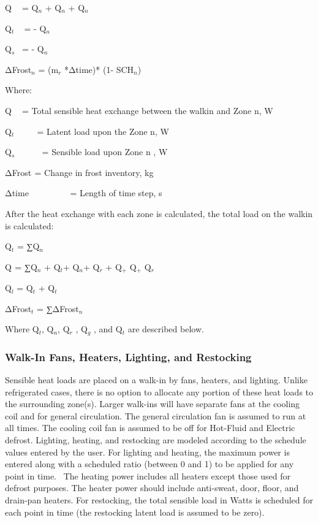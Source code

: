 Q\(_{ }\) ~ = Q\(_{n}\) + Q\(_{n}\) + Q\(_{n}\)

Q\(_{t}\) ~ = - Q\(_{n}\)

Q\(_{s}\)~ = - Q\(_{n}\)

ΔFrost\(_{n}\) = (m\(_{r}\) *Δtime)* (1- SCH\(_{n}\))

Where:

Q\(_{ }\) ~ = Total sensible heat exchange between the walkin and Zone n, W

Q\(_{t}\) ~~~~ = Latent load upon the Zone n, W

Q\(_{s}\) ~~~~~ = Sensible load upon Zone n , W

ΔFrost\(_{ }\) = Change in frost inventory, kg

Δtime~~~~~~~~~ = Length of time step, s

After the heat exchange with each zone is calculated, the total load on the walkin is calculated:

Q\(_{t}\) = ∑Q\(_{n}\)

Q\(_{ }\) = ∑Q\(_{n}\) + Q\(_{t}\)+ Q\(_{n}\)+ Q\(_{r}\) + Q\(_{+}\) Q\(_{+}\) Q\(_{r}\)

Q\(_{l}\) = Q\(_{t}\) + Q\(_{t}\)

ΔFrost\(_{t}\) = ∑ΔFrost\(_{n}\)

Where Q\(_{t}\), Q\(_{n}\), Q\(_{r}\) , Q\(_{g}\) , and Q\(_{t}\) are described below.

\subsubsection{Walk-In Fans, Heaters, Lighting, and Restocking}\label{walk-in-fans-heaters-lighting-and-restocking}

Sensible heat loads are placed on a walk-in by fans, heaters, and lighting. Unlike refrigerated cases, there is no option to allocate any portion of these heat loads to the surrounding zone(s). Larger walk-ins will have separate fans at the cooling coil and for general circulation. The general circulation fan is assumed to run at all times. The cooling coil fan is assumed to be off for Hot-Fluid and Electric defrost. Lighting, heating, and restocking are modeled according to the schedule values entered by the user. For lighting and heating, the maximum power is entered along with a scheduled ratio (between 0 and 1) to be applied for any point in time.~ The heating power includes all heaters except those used for defrost purposes. The heater power should include anti-sweat, door, floor, and drain-pan heaters. For restocking, the total sensible load in Watts is scheduled for each point in time (the restocking latent load is assumed to be zero).

